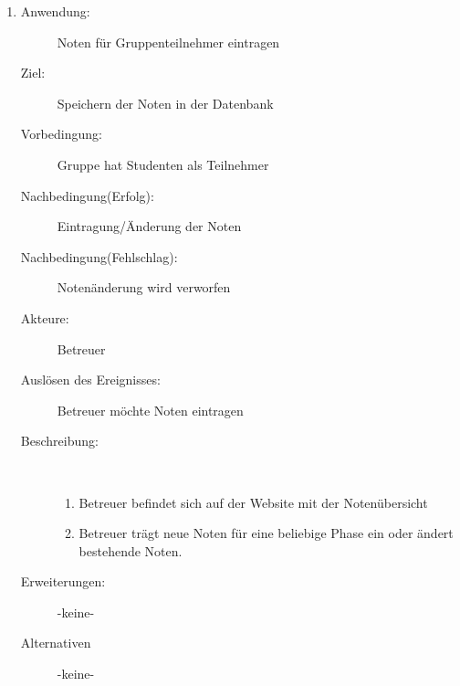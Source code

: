 \documentclass[parskip=full]{scrartcl}
\newcommand{\swtLabel}[1]{\textbf{\textbackslash #1\arabic*0\textbackslash}}
\begin{document}
\begin{enumerate} [label=\swtLabel{B}]
  
  \item
    \begin{description}
  	\item[Anwendung:] Noten für Gruppenteilnehmer eintragen
  	\item[Ziel:] Speichern der Noten in der Datenbank
  	\item[Vorbedingung:] Gruppe hat Studenten als Teilnehmer
  	\item[Nachbedingung(Erfolg):] Eintragung/Änderung der Noten
  	\item[Nachbedingung(Fehlschlag):] Notenänderung wird verworfen
  	\item[Akteure:] Betreuer
  	\item[Auslösen des Ereignisses:] Betreuer möchte Noten eintragen
  	\item[Beschreibung:]~
  	\begin{enumerate} 
  	  \item Betreuer befindet sich auf der Website mit der Notenübersicht
  	  \item Betreuer trägt neue Noten für eine beliebige Phase ein oder ändert bestehende Noten.
  	\end{enumerate}
  	\item[Erweiterungen:] -keine-
  	\item[Alternativen] -keine-
  \end{description}
   
\end{enumerate}
\end{document}
